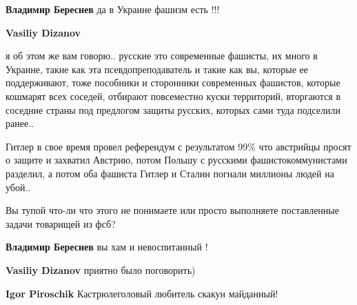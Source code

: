 \begin{itemize}
\begin{itemize}
\textbf{Владимир Береснев} да в Украине фашизм есть !!!


\textbf{Vasiliy Dizanov} 

я об этом же вам говорю.. русские это современные фашисты, их много в Украине,
такие как эта псевдопреподаватель и такие как вы, которые ее поддерживают, тоже
пособники и сторонники современных фашистов, которые кошмарят всех соседей,
отбирают повсеместно куски территорий, вторгаются в соседние страны под
предлогом защиты русских, которых сами туда подселили ранее..

Гитлер в свое время провел референдум с результатом 99\% что австрийцы просят о
защите и захватил Австрию, потом Польшу с русскими фашистокоммунистами
разделил, а потом оба фашиста Гитлер и Сталин погнали миллионы людей на убой..

Вы тупой что-ли что этого не понимаете или просто выполняете поставленные
задачи товарищей из фсб?


\textbf{Владимир Береснев} вы хам и невоспитанный !


\textbf{Vasiliy Dizanov} приятно было поговорить)


\textbf{Igor Piroschik} Кастрюлеголовый любитель скакун майданный!

\end{itemize}


\end{itemize}

